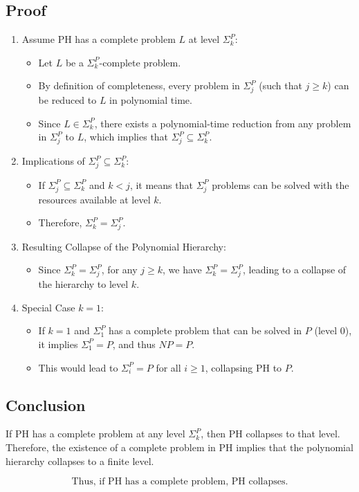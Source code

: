 \documentclass{article}
\begin{document}
\subsection*{Proof}
\begin{enumerate}
    \item Assume PH has a complete problem \( L \) at level \( \Sigma_k^P \):
    \begin{itemize}
        \item Let \( L \) be a \( \Sigma_k^P \)-complete problem.
    \end{itemize}
    \begin{itemize}
    \item By definition of completeness, every problem in \( \Sigma_j^P \) (such that \( j \geq k \)) can be reduced to \( L \) in polynomial time.
        \item Since \( L \in \Sigma_k^P \), there exists a polynomial-time reduction from any problem in \( \Sigma_j^P \) to \( L \), which implies that \( \Sigma_j^P \subseteq \Sigma_k^P \).
    \end{itemize}
\bigskip
    \item Implications of \( \Sigma_j^P \subseteq \Sigma_k^P \):
    \begin{itemize}
        \item If \( \Sigma_j^P \subseteq \Sigma_k^P \) and \( k < j \), it means that \( \Sigma_j^P \) problems can be solved with the resources available at level \( k \).
        \item Therefore, \( \Sigma_k^P = \Sigma_j^P \).
    \end{itemize}
    \item Resulting Collapse of the Polynomial Hierarchy:
    \begin{itemize}
        \item Since \( \Sigma_k^P = \Sigma_j^P \), for any \( j \geq k \), we have \( \Sigma_k^P = \Sigma_j^P \), leading to a collapse of the hierarchy to level \( k \).
    \end{itemize}
    \item Special Case \( k = 1 \):
    \begin{itemize}
        \item If \( k = 1 \) and \( \Sigma_1^P \) has a complete problem that can be solved in \( P \) (level 0), it implies \( \Sigma_1^P = P \), and thus \( NP = P \).
        \item This would lead to \( \Sigma_i^P = P \) for all \( i \geq 1 \), collapsing PH to \( P \).
    \end{itemize}
\end{enumerate}

\subsection*{Conclusion}
If PH has a complete problem at any level \( \Sigma_k^P \), then PH collapses to that level. Therefore, the existence of a complete problem in PH implies that the polynomial hierarchy collapses to a finite level.

\[
\boxed{\text{Thus, if PH has a complete problem, PH collapses.}}
\]
\end{document}
